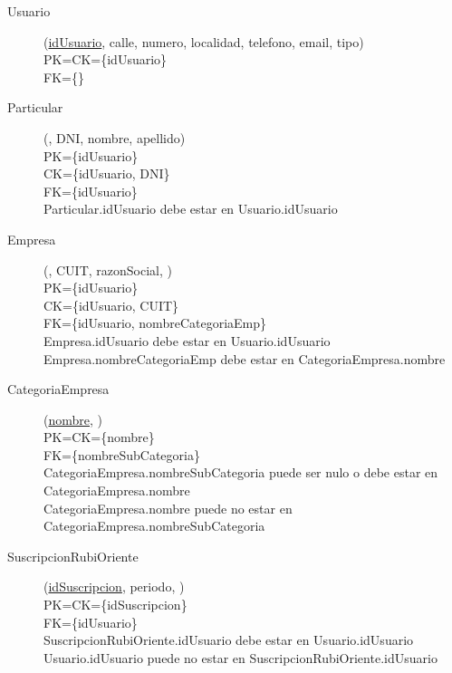 \begin{description}

 \item[Usuario](\underline{idUsuario}, calle, numero, localidad, telefono, email, tipo)\\
PK=CK=\{idUsuario\}\\
FK=\{\}

 \item[Particular](\underline{}, DNI, nombre, apellido)\\
PK=\{idUsuario\}\\
CK=\{idUsuario, DNI\}\\
FK=\{idUsuario\}\\
Particular.idUsuario debe estar en Usuario.idUsuario

 \item[Empresa](\underline{}, CUIT, razonSocial, )\\
PK=\{idUsuario\}\\
CK=\{idUsuario, CUIT\}\\
FK=\{idUsuario, nombreCategoriaEmp\}\\
Empresa.idUsuario debe estar en Usuario.idUsuario\\
Empresa.nombreCategoriaEmp debe estar en CategoriaEmpresa.nombre

 \item[CategoriaEmpresa](\underline{nombre}, )\\
PK=CK=\{nombre\}\\
FK=\{nombreSubCategoria\}\\
CategoriaEmpresa.nombreSubCategoria puede ser nulo o debe estar en CategoriaEmpresa.nombre\\
CategoriaEmpresa.nombre puede no estar en CategoriaEmpresa.nombreSubCategoria

 \item[SuscripcionRubiOriente](\underline{idSuscripcion}, periodo, )\\
PK=CK=\{idSuscripcion\}\\
FK=\{idUsuario\}\\
SuscripcionRubiOriente.idUsuario debe estar en Usuario.idUsuario\\
Usuario.idUsuario puede no estar en SuscripcionRubiOriente.idUsuario


\end{description}

